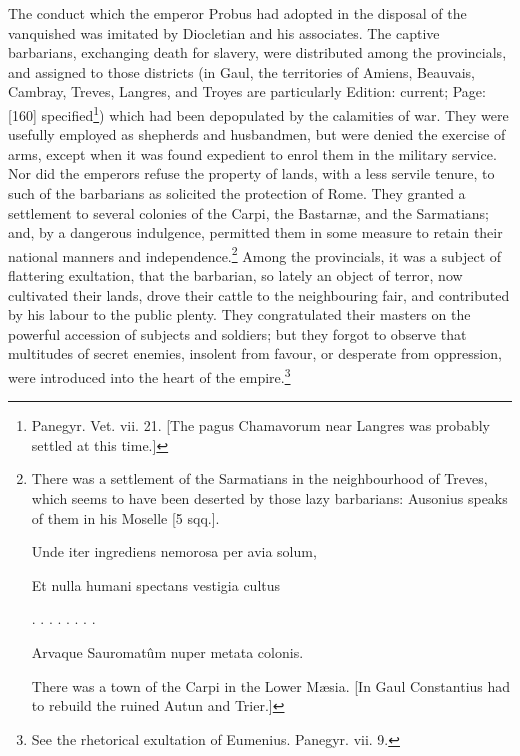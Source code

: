 The conduct which the emperor Probus had adopted in the disposal of the vanquished was imitated by Diocletian and his associates. The captive barbarians, exchanging death for slavery, were distributed among the provincials, and assigned to those districts (in Gaul, the territories of Amiens, Beauvais, Cambray, Treves, Langres, and Troyes are particularly Edition: current; Page: [160] specified\footnote{Panegyr. Vet. vii. 21. [The pagus Chamavorum near Langres was probably settled at this time.]}) which had been depopulated by the calamities of war. They were usefully employed as shepherds and husbandmen, but were denied the exercise of arms, except when it was found expedient to enrol them in the military service. Nor did the emperors refuse the property of lands, with a less servile tenure, to such of the barbarians as solicited the protection of Rome. They granted a settlement to several colonies of the Carpi, the Bastarnæ, and the Sarmatians; and, by a dangerous indulgence, permitted them in some measure to retain their national manners and independence.\footnote{There was a settlement of the Sarmatians in the neighbourhood of Treves, which seems to have been deserted by those lazy barbarians: Ausonius speaks of them in his Moselle [5 sqq.].

Unde iter ingrediens nemorosa per avia solum,

Et nulla humani spectans vestigia cultus

. . . . . . . .

Arvaque Sauromatûm nuper metata colonis.

There was a town of the Carpi in the Lower Mæsia. [In Gaul Constantius had to rebuild the ruined Autun and Trier.]} Among the provincials, it was a subject of flattering exultation, that the barbarian, so lately an object of terror, now cultivated their lands, drove their cattle to the neighbouring fair, and contributed by his labour to the public plenty. They congratulated their masters on the powerful accession of subjects and soldiers; but they forgot to observe that multitudes of secret enemies, insolent from favour, or desperate from oppression, were introduced into the heart of the empire.\footnote{See the rhetorical exultation of Eumenius. Panegyr. vii. 9.}

